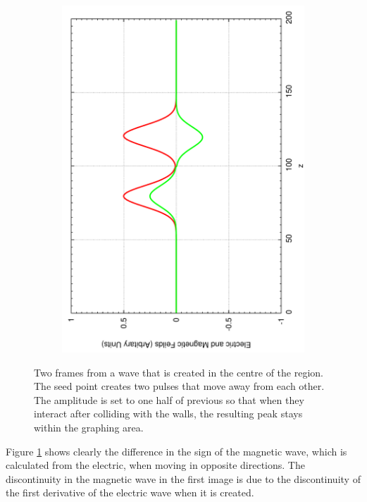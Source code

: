 \begin{figure}[ht]
\begin{subfigure}[ht]{0.45\textwidth}
                \includegraphics[angle=270, width=\textwidth]{centerseed2.pdf}
        \end{subfigure}
        \caption{Two frames from a wave that is created in the centre of the region. The seed point creates two pulses that move away from each other. The amplitude is set to one half of previous so that when they interact after colliding with the walls, the resulting peak stays within the graphing area.}\label{fig:initialcenter}
\end{figure}

Figure \ref{fig:initialcenter} shows clearly the difference in the sign of the magnetic wave, which is calculated from the electric, when moving in opposite directions. The discontinuity in the magnetic wave in the first image is due to the discontinuity of the first derivative of the electric wave when it is created. 

